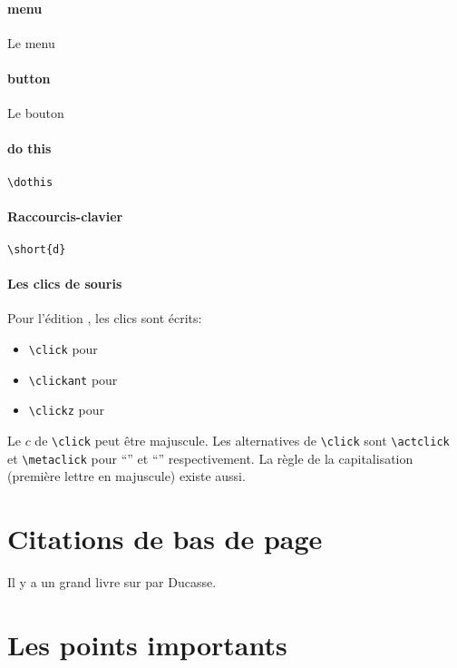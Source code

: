 \documentclass[a4paper,10pt,twoside]{book}
\begin{document}
\paragraph{menu}
Le menu 
\paragraph{button}
Le bouton 
\paragraph{do this}
\verb|\dothis|
\ct{-->}
\paragraph{Raccourcis-clavier}
\verb|\short{d}|
\ct{-->}
\paragraph{Les clics de souris}
Pour l'édition \pharo, les clics sont écrits:
\begin{itemize}
\item \verb|\click| pour \click{}
\item \verb|\clickant| pour \clickant{}
\item \verb|\clickz| pour \clickz{}
\end{itemize}

Le $c$ de \verb|\click| peut être majuscule. Les alternatives de
\verb|\click| sont \verb|\actclick| et \verb|\metaclick| pour
``\actclick'' et ``\metaclick'' respectivement. La règle de la
capitalisation (première lettre en majuscule) existe aussi.
\section*{Citations de bas de page}
Il y a un grand livre sur \squeak par Ducasse\cite{Duca05j}.
\section*{Les points importants}
\end{document}

